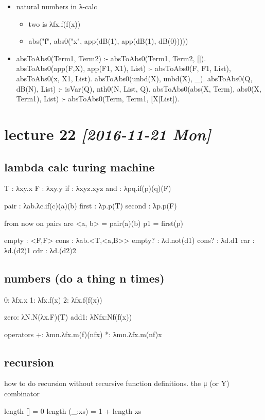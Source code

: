 \documentclass[11pt]{article}
\begin{document}
\begin{itemize}
\item natural numbers in λ-calc
\begin{itemize}
\item two is λfx.f(f(x))
\item abs("f", abs0("x", app(dB(1), app(dB(1), dB(0)))))
\end{itemize}
\item absToAbs0(Term1, Term2) :- absToAbs0(Term1, Term2, []).
absToAbs0(app(F,X), app(F1, X1), List) :- 
  absToAbs0(F, F1, List),
  absToAbs0(x, X1, List).
absToAbs0(unbd(X), unbd(X), \_).
absToAbs0(Q, dB(N), List) :-
  isVar(Q),
  nth0(N, List, Q).
absToAbs0(abs(X, Term), abs0(X, Term1), List) :-
  absToAbs0(Term, Term1, [X|List]).
\end{itemize}
\section{lecture 22 \textit{[2016-11-21 Mon]}}
\label{sec-20}
\subsection{lambda calc turing machine}
\label{sec-20-1}
T : λxy.x
F : λxy.y
if : λxyz.xyz
and : λpq.if(p)(q)(F)

pair : λab.λc.if(c)(a)(b)
first : λp.p(T)
second : λp.p(F)

from now on pairs are
<a, b> = pair(a)(b)
p1 = first(p)

empty : <F,F>
cons : λab.<T,<a,B>>
empty? : λd.not(d1)
cons? : λd.d1
car : λd.(d2)1 
cdr : λd.(d2)2

\subsection{numbers (do a thing n times)}
\label{sec-20-2}
0: λfx.x
1: λfx.f(x)
2: λfx.f(f(x))

zero: λN.N(λx.F)(T)
add1: λNfx:Nf(f(x))

operators
+: λmn.λfx.m(f)(nfx)
*: λmn.λfx.m(nf)x






\subsection{recursion}
\label{sec-20-3}
how to do recursion without recursive function definitions. the μ (or Y) combinator

length [] = 0
length (\_:xs) = 1 + length xs
\end{document}
